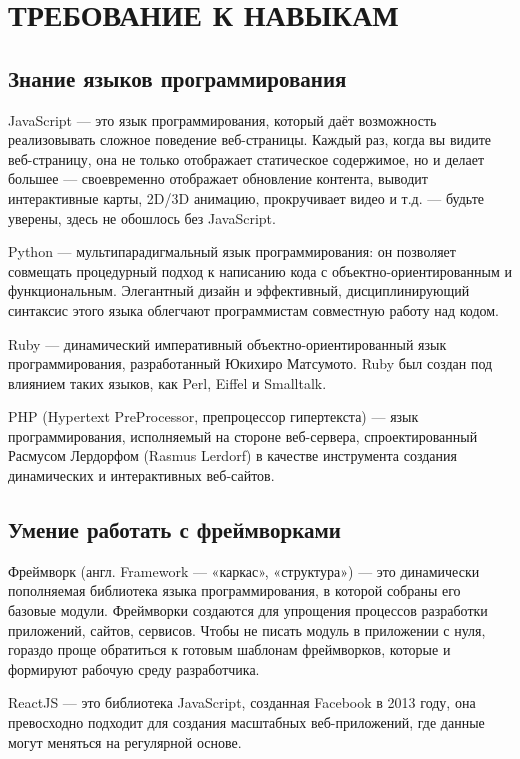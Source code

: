 \documentclass[referat, times]{SCWorks}
\begin{document}
\section{\textbf{ТРЕБОВАНИЕ К НАВЫКАМ}}
 \subsection{Знание языков программирования}

JavaScript — это язык программирования, который даёт возможность реализовывать сложное поведение веб-страницы. Каждый раз, когда вы видите веб-страницу, она не только отображает статическое содержимое, но и делает большее --- своевременно отображает обновление контента, выводит интерактивные карты, 2D/3D анимацию, прокручивает видео и т.д. --- будьте уверены, здесь не обошлось без JavaScript\cite{6}.

Python --- мультипарадигмальный язык программирования: он позволяет совмещать процедурный подход к написанию кода с объектно-ориентированным и функциональным.  Элегантный дизайн и эффективный, дисциплинирующий синтаксис этого языка облегчают программистам совместную работу над кодом.

Ruby --- динамический императивный объектно-ориентированный язык программирования, разработанный Юкихиро Матсумото. Ruby был создан под влиянием таких языков, как Perl, Eiffel и Smalltalk.

PHP (Hypertext PreProcessor, препроцессор гипертекста) --- язык программирования, исполняемый на стороне веб-сервера, спроектированный Расмусом Лердорфом (Rasmus Lerdorf) в качестве инструмента создания динамических и интерактивных веб-сайтов\cite{7}.

\subsection{Умение работать с фреймворками}

Фреймворк (англ. Framework — «каркас», «структура») --- это динамически пополняемая библиотека языка программирования, в которой собраны его базовые модули. Фреймворки создаются для упрощения процессов разработки приложений, сайтов, сервисов. Чтобы не писать модуль в приложении с нуля, гораздо проще обратиться к готовым шаблонам фреймворков, которые и формируют рабочую среду разработчика.

ReactJS --- это библиотека JavaScript, созданная Facebook в 2013 году, она превосходно подходит для создания масштабных веб-приложений, где данные могут меняться на регулярной основе.
\end{document}

